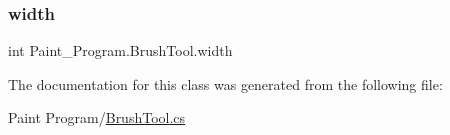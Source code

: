 \mbox{\label{class_paint___program_1_1_brush_tool_a2d11ac1381688670b77779849c220256}} 
\subsubsection{\texorpdfstring{width}{width}}
{\footnotesize\ttfamily int Paint\+\_\+\+Program.\+Brush\+Tool.\+width\hspace{0.3cm}{\ttfamily [private]}}



The documentation for this class was generated from the following file\+:\begin{DoxyCompactItemize}
\item 
Paint Program/\mbox{\hyperlink{_brush_tool_8cs}{Brush\+Tool.\+cs}}\end{DoxyCompactItemize}
